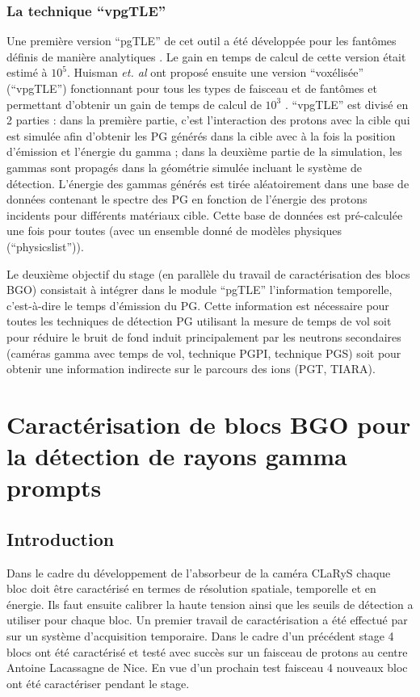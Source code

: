 \documentclass[11pt,a4paper,oldfontcommands]{memoir}
\begin{document}
\subsection{La technique \enquote{vpgTLE}}

Une première version \enquote{pgTLE} de cet outil a été développée pour les fantômes définis de manière analytiques \cite{El_Kanawati_2015}. Le gain en temps de calcul de cette version était estimé à $10^5$. Huisman \textit{et. al} ont proposé ensuite une version \enquote{voxélisée} (\enquote{vpgTLE}) fonctionnant pour tous les types de faisceau et de fantômes et permettant d'obtenir un gain de temps de calcul de $10^3$ \cite{Huisman_2016}. \enquote{vpgTLE} est divisé en 2 parties : dans la première partie, c'est l'interaction des protons avec la cible qui est simulée afin d'obtenir les PG générés dans la cible avec à la fois la position d'émission et l'énergie du gamma  ; dans la deuxième partie de la simulation, les gammas sont propagés dans la géométrie simulée incluant le système de détection. L'énergie des gammas générés est tirée aléatoirement dans une base de données contenant le spectre des PG en fonction de l'énergie des protons incidents pour différents matériaux cible. Cette base de données est pré-calculée une fois pour toutes (avec un ensemble donné de modèles physiques (\enquote{physicslist})).

Le deuxième objectif du stage (en parallèle du travail de caractérisation des blocs BGO) consistait à intégrer dans le module \enquote{pgTLE} l'information temporelle, c'est-à-dire le temps d'émission du PG. Cette information est nécessaire pour toutes les techniques de détection PG utilisant la mesure de temps de vol soit pour réduire le bruit de fond induit principalement par les neutrons secondaires (caméras gamma avec temps de vol, technique PGPI, technique PGS) soit pour obtenir une information indirecte sur le parcours des ions (PGT, TIARA).


\openany
\chapter{Caractérisation de blocs BGO pour la détection de rayons gamma prompts}

\section{Introduction}

Dans le cadre du développement de l'absorbeur de la caméra CLaRyS chaque bloc doit être caractérisé en termes de résolution spatiale, temporelle et en énergie. Ils faut ensuite calibrer la haute tension ainsi que les seuils de détection a utiliser pour chaque bloc. Un premier travail de caractérisation a été effectué par \cite{Fontana_2018} sur un système d'acquisition temporaire. Dans le cadre d'un précédent stage 4 blocs ont été caractérisé et testé avec succès sur un faisceau de protons au centre Antoine Lacassagne de Nice. En vue d'un prochain test faisceau 4 nouveaux bloc ont été caractériser pendant le stage.
\end{document}
